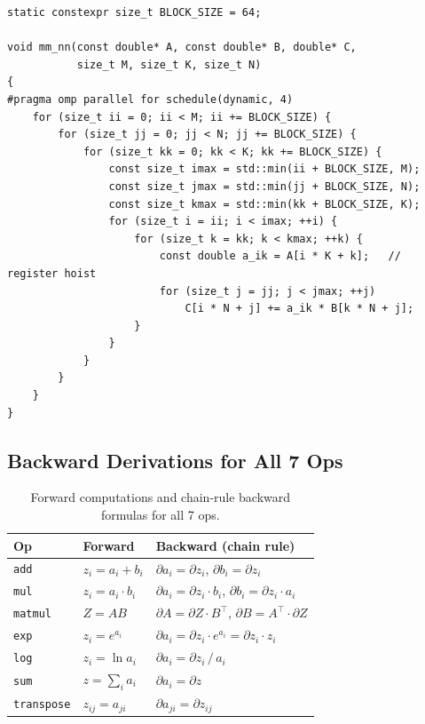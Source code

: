 \documentclass[12pt, a4paper]{article}
\begin{document}
\begin{lstlisting}[caption={\texttt{mm\_nn} - cache-blocked tiled GEMM kernel}]
static constexpr size_t BLOCK_SIZE = 64;

void mm_nn(const double* A, const double* B, double* C,
           size_t M, size_t K, size_t N)
{
#pragma omp parallel for schedule(dynamic, 4)
    for (size_t ii = 0; ii < M; ii += BLOCK_SIZE) {
        for (size_t jj = 0; jj < N; jj += BLOCK_SIZE) {
            for (size_t kk = 0; kk < K; kk += BLOCK_SIZE) {
                const size_t imax = std::min(ii + BLOCK_SIZE, M);
                const size_t jmax = std::min(jj + BLOCK_SIZE, N);
                const size_t kmax = std::min(kk + BLOCK_SIZE, K);
                for (size_t i = ii; i < imax; ++i) {
                    for (size_t k = kk; k < kmax; ++k) {
                        const double a_ik = A[i * K + k];   // register hoist
                        for (size_t j = jj; j < jmax; ++j)
                            C[i * N + j] += a_ik * B[k * N + j];
                    }
                }
            }
        }
    }
}
\end{lstlisting}

\subsection{Backward Derivations for All 7 Ops}

\begin{table}[!ht]
\centering
\renewcommand{\arraystretch}{1.5}
\begin{tabularx}{\textwidth}{@{} l l L @{}}
\toprule
\textbf{Op} & \textbf{Forward} & \textbf{Backward (chain rule)} \\
\midrule
\texttt{add}
  & \(z_i = a_i + b_i\)
  & \(\partial a_i = \partial z_i\), \quad
    \(\partial b_i = \partial z_i\) \\

\texttt{mul}
  & \(z_i = a_i \cdot b_i\)
  & \(\partial a_i = \partial z_i \cdot b_i\), \quad
    \(\partial b_i = \partial z_i \cdot a_i\) \\

\texttt{matmul}
  & \(Z = A B\)
  & \(\partial A = \partial Z \cdot B^{\top}\), \quad
    \(\partial B = A^{\top} \cdot \partial Z\) \\

\texttt{exp}
  & \(z_i = e^{a_i}\)
  & \(\partial a_i = \partial z_i \cdot e^{a_i} = \partial z_i \cdot z_i\) \\

\texttt{log}
  & \(z_i = \ln a_i\)
  & \(\partial a_i = \partial z_i \,/\, a_i\) \\

\texttt{sum}
  & \(z = \sum_i a_i\)
  & \(\partial a_i = \partial z\) \; \\

\texttt{transpose}
  & \(z_{ij} = a_{ji}\)
  & \(\partial a_{ji} = \partial z_{ij}\)
    \; \\
\bottomrule
\end{tabularx}
\caption{Forward computations and chain-rule backward formulas for all 7 ops.}
\end{table}
\end{document}
